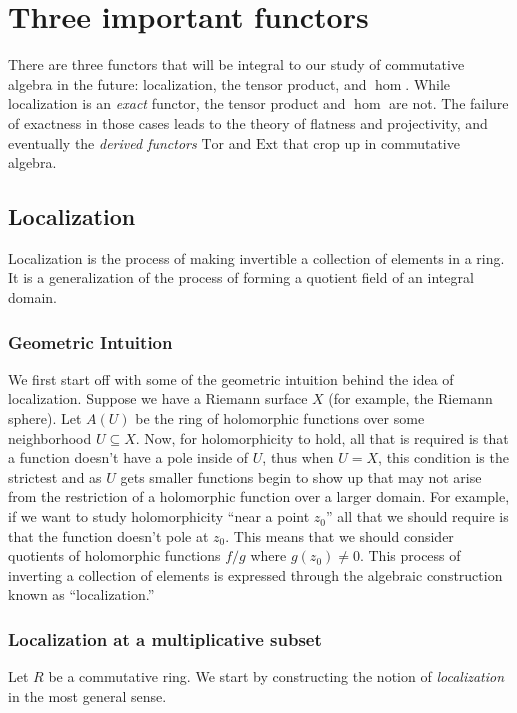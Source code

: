 \chapter{Three important functors}

There are three functors that will be integral to our study of commutative
algebra in the future: localization, the tensor product, and $\hom$.
While localization is an \emph{exact} functor, the tensor product and $\hom$
are not. The failure of exactness in those cases leads to the theory of
flatness and projectivity, and eventually the \emph{derived functors}
$\mathrm{Tor}$ and $\mathrm{Ext}$ that crop up in commutative algebra.

\section{Localization}

Localization is the process of making invertible a collection of elements in a
ring. It is a generalization of the process of forming a quotient field of an
integral domain.  

\subsection{Geometric Intuition}
We first start off with some of the geometric intuition behind the idea of localization. Suppose we have a Riemann surface $X$ (for example, the Riemann sphere). Let $A(U)$ be the ring of holomorphic functions over some neighborhood $U\subseteq X$. Now, for holomorphicity to hold, all that is required is that a function doesn't have a pole inside of $U$, thus when $U=X$, this condition is the strictest and as $U$ gets smaller functions begin to show up that may not arise from the restriction of a holomorphic function over a larger domain. For example, if we want to study holomorphicity ``near a point $z_0$'' all that we should require is that the function doesn't pole at $z_0$. This means that we should consider quotients of holomorphic functions $f/g$ where $g(z_0)\neq 0$. This process of inverting a collection of elements is expressed through the algebraic construction known as ``localization.''


\subsection{Localization at a multiplicative subset}

Let $R$ be a commutative ring. 
We start by constructing the notion of \emph{localization} in the most general
sense.

